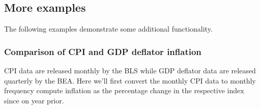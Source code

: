 \documentclass[letterpaper,10pt,openany,oneside,english]{sphinxmanual}
\begin{document}
\noindent{}


\subsection{More examples}
\label{\detokenize{fredpy_examples:More-examples}}
The following examples demonstrate some additional 
functionality.


\subsubsection{Comparison of CPI and GDP deflator inflation}
\label{\detokenize{fredpy_examples:Comparison-of-CPI-and-GDP-deflator-inflation}}
CPI data are released monthly by the BLS while GDP deflator data are
released quarterly by the BEA. Here we’ll first convert the monthly CPI
data to monthly frequency compute inflation as the percentage change in
the respective index since on year prior.
\end{document}
